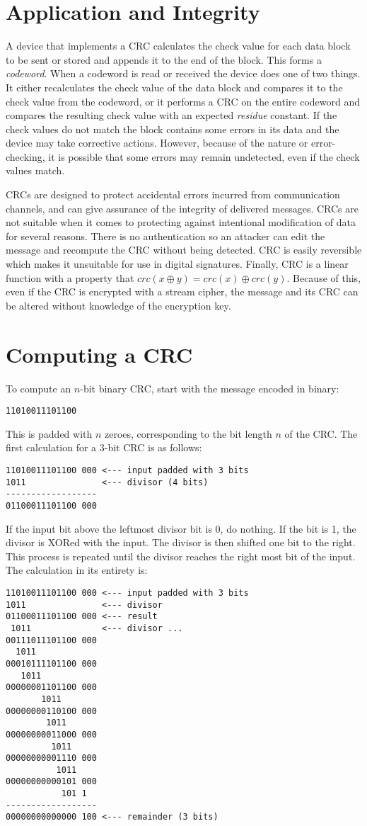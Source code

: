 \documentclass{article}
\begin{document}
\section{Application and Integrity}
A device that implements a CRC calculates the check value for each data block to be sent or stored and appends it to the
end of the block. This forms a \textit{codeword}. When a codeword is read or received the device does one of two things.
It either recalculates the check value of the data block and compares it to the check value from the codeword, or it
performs a CRC on the entire codeword and compares the resulting check value with an expected \textit{residue} constant.
If the check values do not match the block contains some errors in its data and the device may take corrective actions.
However, because of the nature or error-checking, it is possible that some errors may remain undetected, even if the check values
match. 

CRCs are designed to protect accidental errors incurred from communication channels, and can give assurance of the integrity of 
delivered messages. CRCs are not suitable when it comes to protecting against intentional modification of data for several reasons. 
There is no authentication so an attacker can edit the message and recompute the CRC without being detected. CRC is easily reversible
which makes it unsuitable for use in digital signatures. Finally, CRC is a linear function with a property that $crc(x \oplus y) =
crc(x) \oplus crc(y)$. Because of this, even if the CRC is encrypted with a stream cipher, the message and its CRC can be altered
without knowledge of the encryption key. 

\section{Computing a CRC}
To compute an $n$-bit binary CRC, start with the message encoded in binary:
\begin{verbatim}
11010011101100
\end{verbatim}
This is padded with $n$ zeroes, corresponding to the bit length $n$ of the CRC. The first calculation for a 3-bit CRC is as follows:
\begin{verbatim}
11010011101100 000 <--- input padded with 3 bits
1011               <--- divisor (4 bits) 
------------------
01100011101100 000
\end{verbatim}
If the input bit above the leftmost divisor bit is 0, do nothing. If the bit is 1, the divisor is XORed with the input. The divisor is
then shifted one bit to the right. This process is repeated until the divisor reaches the right most bit of the input. The calculation
in its entirety is:
\begin{verbatim}
11010011101100 000 <--- input padded with 3 bits
1011               <--- divisor
01100011101100 000 <--- result
 1011              <--- divisor ...
00111011101100 000
  1011
00010111101100 000
   1011
00000001101100 000
       1011
00000000110100 000
        1011
00000000011000 000
         1011
00000000001110 000
          1011
00000000000101 000
           101 1
------------------
00000000000000 100 <--- remainder (3 bits)
\end{verbatim}
\end{document}
